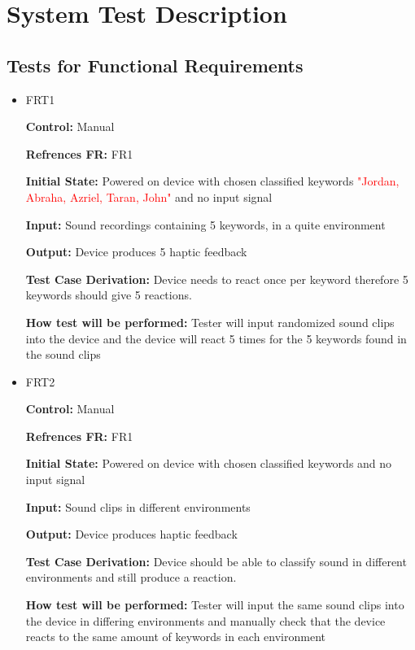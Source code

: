 \documentclass[12pt, titlepage]{article}
\begin{document}
\section{System Test Description}
	
\subsection{Tests for Functional Requirements}

\begin{itemize}

\item{FRT1}

\textbf{Control:} Manual

\textbf{Refrences FR:} FR1 					

\textbf{Initial State:} Powered on device with chosen classified keywords \textcolor{red}{"Jordan, Abraha, Azriel, Taran, John"} and no input signal
					
\textbf{Input:} Sound recordings containing 5 keywords, in a quite environment
					
\textbf{Output:} Device produces 5 haptic feedback

\textbf{Test Case Derivation:} Device needs to react once per keyword therefore 5 keywords should give 5 reactions.
					
\textbf{How test will be performed:} Tester will input randomized sound clips into the device and the device will react 5 times for the 5 keywords found in the sound clips
 

\item{FRT2}

\textbf{Control:} Manual

\textbf{Refrences FR:} FR1 					

\textbf{Initial State:} Powered on device with chosen classified keywords and no input signal 
					
\textbf{Input:} Sound clips in different environments
					
\textbf{Output:} Device produces haptic feedback

\textbf{Test Case Derivation:} Device should be able to classify sound in different environments and still produce a reaction.
					
\textbf{How test will be performed:} Tester will input the same sound clips into the device in differing environments and manually check that the device reacts to the same amount of keywords in each environment 


\end{itemize}
\end{document}
